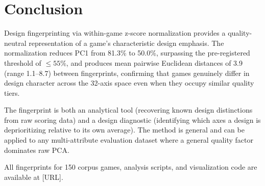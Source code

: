 \section{Conclusion}
\label{sec:conclusion}

Design fingerprinting via within-game z-score normalization provides a quality-neutral
representation of a game's characteristic design emphasis. The normalization reduces PC1
from 81.3\% to 50.0\%, surpassing the pre-registered threshold of $\leq 55\%$, and
produces mean pairwise Euclidean distances of 3.9 (range 1.1--8.7) between fingerprints,
confirming that games genuinely differ in design character across the 32-axis space even
when they occupy similar quality tiers.

The fingerprint is both an analytical tool (recovering known design distinctions from
raw scoring data) and a design diagnostic (identifying which axes a design is
deprioritizing relative to its own average). The method is general and can be applied
to any multi-attribute evaluation dataset where a general quality factor dominates
raw PCA.

All fingerprints for 150 corpus games, analysis scripts, and visualization code are
available at [URL].
